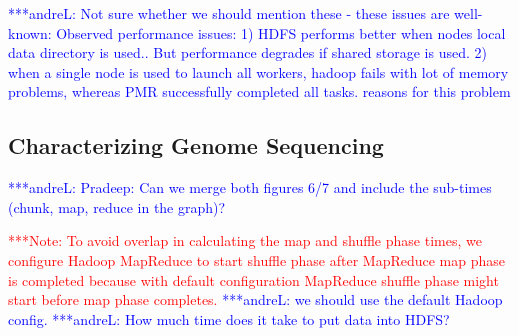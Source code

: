 \documentclass{acm_proc_article-sp}
\newcommand{\alnote}[1]{ {\textcolor{blue} { ***andreL: #1 }}}
\newcommand{\pnote}[1]{ {\textcolor{magenta} { ***pradeep: #1 }}}
\newcommand{\note}[1]{ {\textcolor{red} { ***Note: #1 }}}
\newcommand{\alnote}[1]{}
\newcommand{\pnote}[1]{}
\newcommand{\note}[1]{}
\begin{document}



\alnote{Not sure whether we should mention these - these issues are well-known: Observed performance issues:
1) HDFS performs better when nodes local data directory is used.. But performance degrades if shared storage is used. 			
2) when a single node is used to launch all workers, hadoop fails with lot of memory problems, whereas PMR successfully completed all tasks.			
reasons for this problem}




\subsection{Characterizing Genome Sequencing}

\alnote{Pradeep: Can we merge both figures 6/7 and include the sub-times 
(chunk, map, reduce in the graph)?}

\note{To avoid overlap in calculating the map and shuffle phase times, we
configure Hadoop MapReduce to start shuffle phase after MapReduce map phase is
completed because with default configuration MapReduce shuffle phase might
start before map phase completes.}\alnote{we should use the default Hadoop 
config.}
\alnote{How much time does it take to put data into HDFS?}
\end{document}
